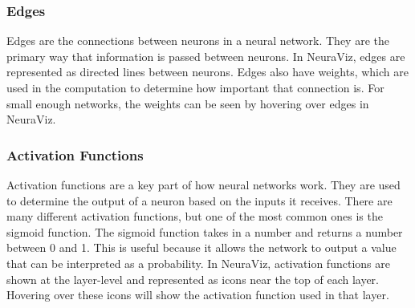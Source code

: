 \subsubsection{Edges}
Edges are the connections between neurons in a neural network. They are the primary way that information is passed between neurons. In NeuraViz, edges are represented as directed lines between neurons. Edges also have weights, which are used in the computation to determine how important that connection is. For small enough networks, the weights can be seen by hovering over edges in NeuraViz.

\subsubsection{Activation Functions}
Activation functions are a key part of how neural networks work. They are used to determine the output of a neuron based on the inputs it receives. There are many different activation functions, but one of the most common ones is the sigmoid function. The sigmoid function takes in a number and returns a number between 0 and 1. This is useful because it allows the network to output a value that can be interpreted as a probability. In NeuraViz, activation functions are shown at the layer-level and represented as icons near the top of each layer. Hovering over these icons will show the activation function used in that layer.
